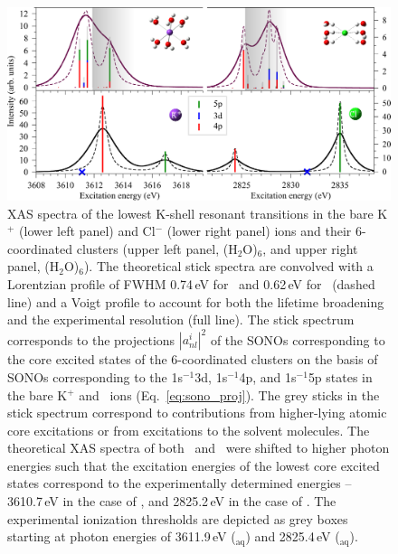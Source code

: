 \begin{figure}[h!]
\centering
\includegraphics[scale=0.55]{figures/xas_spectra.eps}
\caption{XAS spectra of the lowest K-shell resonant transitions in the bare K$^{+}$ (lower left panel) and Cl$^{-}$ (lower right panel) ions and their 6-coordinated clusters (upper left panel, \ki(H$_2$O)$_6$, and upper right panel, \cli(H$_2$O)$_6$). The theoretical stick spectra are convolved with a Lorentzian profile of FWHM 0.74\,eV for \ki~and 0.62\,eV for \cli~(dashed line)\citep{ceolin17:263003} and a Voigt profile to account for both the lifetime broadening and the experimental resolution (full line). The stick spectrum corresponds to the projections $|a_{nl}^{i}|^2$ of the SONOs corresponding to the core excited states of the 6-coordinated clusters on the basis of SONOs corresponding to the 1s$^{-1}$3d, 1s$^{-1}$4p, and 1s$^{-1}$5p states in the bare K$^+$ and \cli~ions (Eq.\ \ref{eq:sono_proj}). The grey sticks in the stick spectrum correspond to contributions from higher-lying atomic core excitations or from excitations to the solvent molecules. The theoretical XAS spectra of both \ki~and \cli~were shifted to higher photon energies such that the excitation energies of the lowest core excited states correspond to the experimentally determined energies -- 3610.7\,eV in the case of \ki, and 2825.2\,eV in the case of \cli. The experimental ionization thresholds are depicted as grey boxes starting at photon energies of 3611.9\,eV (\ki$_{\text{aq}}$) and 2825.4\,eV (\cli$_{\text{aq}}$).}
\label{fg:xas_kcl}
\end{figure}


